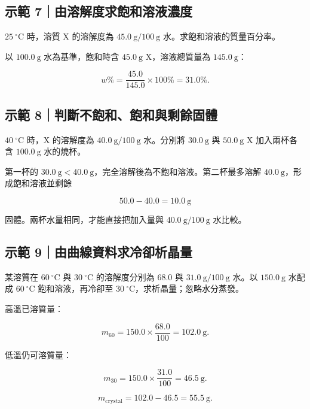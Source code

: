\documentclass[11pt,a4paper]{article}
\begin{document}
\begin{HandoutWorkedExample}

\subsection{示範 7｜由溶解度求飽和溶液濃度}\label{ux793aux7bc4-7ux7531ux6eb6ux89e3ux5ea6ux6c42ux98fdux548cux6eb6ux6db2ux6fc3ux5ea6}

\(25\ ^\circ\mathrm C\) 時，溶質 X 的溶解度為 \(45.0\ \mathrm g/100\ \mathrm g\) 水。求飽和溶液的質量百分率。

以 \(100.0\ \mathrm g\) 水為基準，飽和時含 \(45.0\ \mathrm g\) X，溶液總質量為 \(145.0\ \mathrm g\)：

\[
w\%=\frac{45.0}{145.0}\times100\%=31.0\%.
\]

\end{HandoutWorkedExample}

\begin{HandoutWorkedExample}

\subsection{示範 8｜判斷不飽和、飽和與剩餘固體}\label{ux793aux7bc4-8ux5224ux65b7ux4e0dux98fdux548cux98fdux548cux8207ux5269ux9918ux56faux9ad4}

\(40\ ^\circ\mathrm C\) 時，X 的溶解度為 \(40.0\ \mathrm g/100\ \mathrm g\) 水。分別將 \(30.0\ \mathrm g\) 與 \(50.0\ \mathrm g\) X 加入兩杯各含 \(100.0\ \mathrm g\) 水的燒杯。

第一杯的 \(30.0\ \mathrm g<40.0\ \mathrm g\)，完全溶解後為不飽和溶液。第二杯最多溶解 \(40.0\ \mathrm g\)，形成飽和溶液並剩餘

\[
50.0-40.0=10.0\ \mathrm g
\]

固體。兩杯水量相同，才能直接把加入量與 \(40.0\ \mathrm g/100\ \mathrm g\) 水比較。

\end{HandoutWorkedExample}

\begin{HandoutWorkedExample}

\subsection{示範 9｜由曲線資料求冷卻析晶量}\label{ux793aux7bc4-9ux7531ux66f2ux7ddaux8cc7ux6599ux6c42ux51b7ux537bux6790ux6676ux91cf}

某溶質在 \(60\ ^\circ\mathrm C\) 與 \(30\ ^\circ\mathrm C\) 的溶解度分別為 \(68.0\) 與 \(31.0\ \mathrm g/100\ \mathrm g\) 水。以 \(150.0\ \mathrm g\) 水配成 \(60\ ^\circ\mathrm C\) 飽和溶液，再冷卻至 \(30\ ^\circ\mathrm C\)，求析晶量；忽略水分蒸發。

高溫已溶質量：

\[
m_{60}=150.0\times\frac{68.0}{100}=102.0\ \mathrm g.
\]

低溫仍可溶質量：

\[
m_{30}=150.0\times\frac{31.0}{100}=46.5\ \mathrm g.
\]

\[
m_{\mathrm{crystal}}=102.0-46.5=55.5\ \mathrm g.
\]

\end{HandoutWorkedExample}
\end{document}
